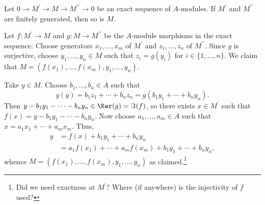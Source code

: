\begin{exercise}
Let \(0 \to M^\prime \to M \to M^{\prime\prime} \to 0\) be an exact sequence of \(A\)-modules.
If \(M^\prime\) and \(M^{\prime\prime}\) are finitely generated, then so is \(M\).
\end{exercise}

\begin{solution}
Let \(f : M^\prime \to M\) and \(g : M \to M^{\prime\prime}\) be the \(A\)-module morphisms in the exact sequence.
Choose generators \(x_1, \ldots, x_m\) of \(M^\prime\) and \(z_1, \ldots, z_n\) of \(M^{\prime\prime}\).
Since \(g\) is surjective, choose \(y_1, \ldots, y_n \in M\) such that \(z_i = g(y_i)\) for \(i \in \{1, \ldots, n\}\).
We claim that \(M = (f(x_1), \ldots, f(x_m), y_1, \ldots, y_n)\).

Take \(y \in M\).
Choose \(b_1, \ldots, b_n \in A\) such that
\begin{equation*}
g(y) = b_1 z_1 + \cdots + b_n z_n = g(b_1 y_1 + \cdots + b_n y_n).
\end{equation*}
Then \(y - b_1 y_1 - \cdots - b_n y_n \in \Ker(g) = \Im(f)\), so there exists \(x \in M^\prime\) such that \(f(x) = y - b_1 y_1 - \cdots - b_n y_n\).
Now choose \(a_1, \ldots, a_m \in A\) such that \(x = a_1 x_1 + \cdots + a_m x_m\).
Thus,
\begin{align*}
y
&= f(x) + b_1 y_1 + \cdots + b_n y_n \\
&= a_1 f(x_1) + \cdots + a_m f(x_m) + b_1 y_1 + \cdots + b_n y_n,
\end{align*}
whence \(M = (f(x_1), \ldots, f(x_m), y_1, \ldots, y_n)\) as claimed.\footnote{%
Did we need exactness at \(M^\prime\)?
Where (if anywhere) is the injectivity of \(f\) used?
}
\end{solution}